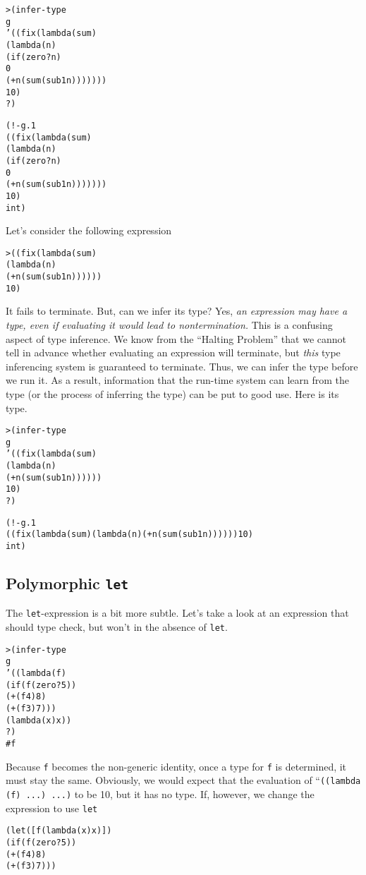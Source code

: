 \begin{alltt}
> (infer-type
    g
    '((fix (lambda (sum)
             (lambda (n)
               (if (zero? n)
                 0
                 (+ n (sum (sub1 n)))))))
      10)
    ?)

(!- g.1
    ((fix (lambda (sum)
            (lambda (n)
              (if (zero? n)
                0 
                (+ n (sum (sub1 n)))))))
     10)
    int)
\end{alltt}

Let's consider the following expression
\begin{alltt}
> ((fix (lambda (sum)
          (lambda (n)
            (+ n (sum (sub1 n))))))
   10)
\end{alltt}

It fails to terminate.  But, can we infer its type?  Yes, \emph{an
expression may have a type, even if evaluating it would lead to
nontermination.}  This is a confusing aspect of type inference.  We
know from the ``Halting Problem'' that we cannot tell in advance
whether evaluating an expression will terminate, but \emph{this}
type inferencing system is guaranteed to terminate.  Thus, we
can infer the type before we run it.  As a result, information that
the run-time system can learn from the type (or the process of
inferring the type) can be put to good use.  Here is its type.

\begin{alltt}
> (infer-type
    g
    '((fix (lambda (sum)
             (lambda (n)
               (+ n (sum (sub1 n))))))
      10)
    ?)

(!- g.1
    ((fix (lambda (sum) (lambda (n) (+ n (sum (sub1 n)))))) 10)
    int)
\end{alltt}

\newpage
\subsection{Polymorphic \texttt{let}}

The \texttt{let}-expression is a bit more subtle.  Let's take a look at
an expression that should type check, but won't in the absence of
\texttt{let}.

\begin{alltt}
> (infer-type
    g
    '((lambda (f)
        (if (f (zero? 5))
          (+ (f 4) 8)
          (+ (f 3) 7)))
      (lambda (x) x))
    ?)
#f
\end{alltt}

Because \texttt{f} becomes the non-generic identity, once a type for
\texttt{f} is determined, it must stay the same.  Obviously, we would
expect that the evaluation of ``\texttt{((lambda (f) ...) ...)}
to be 10, but it has no type.  If, however, we change the
expression to use \texttt{let}
\begin{alltt}
(let ([f (lambda (x) x)])
  (if (f (zero? 5))
    (+ (f 4) 8)
    (+ (f 3) 7)))
\end{alltt}

